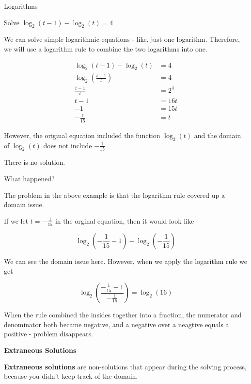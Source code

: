 \documentclass{ximera}
\begin{document}
\begin{example} Logarithms


Solve $\log_2(t-1) - \log_2(t) = 4$


\begin{explanation}


We can solve simple logarithmic equations - like, just one logarithm.  Therefore, we will use a logarithm rule to combine the two logarithms into one.




\begin{align*}
\log_2(t-1) - \log_2(t) & = 4   \\
\log_2 \left( \frac{t-1}{t} \right)  & = 4  \\
\frac{t-1}{t} & = 2^4  \\
 t-1 & = 16t  \\
-1 & = 15t  \\
-\frac{1}{15} & = t
\end{align*}



However, the original equation included the function $\log_2(t)$ and the domain of $\log_2(t)$ does not include $-\frac{1}{15}$


There is no solution.

\end{explanation}

\end{example}


What happened?


The problem in the above example is that the logarithm rule covered up a domain issue.

If we let $t = -\frac{1}{15}$ in the orginal equation, then it would look like 


\[    \log_2\left(-\frac{1}{15}-1\right) - \log_2\left(-\frac{1}{15}\right)   \]

We can see the domain issue here.  However, when we apply the logarithm rule we get



\[   \log_2\left(\frac{-\frac{1}{15}-1}{-\frac{1}{15}}\right)    = \log_2(16)  \]


When the rule combined the insides together into a fraction, the numerator and denominator both became negative, and a negative over a neagtive equals a positive - problem disappears.





\begin{definition}  \textbf{\textcolor{green!50!black}{Extraneous Solutions}}

\textbf{Extraneous solutions} are non-solutions that appear during the solving process, because you didn't keep track of the domain.

\end{definition}
\end{document}
